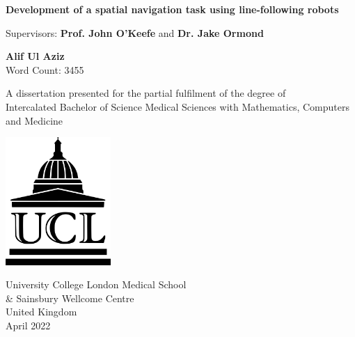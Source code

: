 \documentclass{article}
\newcommand{\detailtexcount}[1]{%
  \immediate\write18{texcount -merge -sum -q #1.tex output.bbl > #1.wcdetail }%
}
\newcommand{\quickwordcount}[1]{%
  \immediate\write18{texcount -1 -sum -merge -q #1.tex output.bbl > #1-words.sum }%
   words%
}
\newcommand{\quickcharcount}[1]{%
  \immediate\write18{texcount -1 -sum -merge -char -q #1.tex output.bbl > #1-chars.sum }%
   characters (not including spaces)%
}
\begin{document}
\doublespacing

\begin{titlepage}
   \begin{center}
       \vspace*{0.5cm}
    \large
       \textbf{Development of a spatial navigation task using line-following robots}

       \vspace{0.5cm}
        Supervisors: \textbf{Prof. John O'Keefe} and \textbf{Dr. Jake Ormond}
            
       \vspace{1.5cm}

       \textbf{Alif Ul Aziz} \\
       Word Count: 3455
       \vfill
            
       A dissertation presented for the partial fulfilment of the degree of\\
       Intercalated Bachelor of Science Medical Sciences with Mathematics, Computers and Medicine
            
       \vspace{0.8cm}
     
       \includegraphics[width=0.3\textwidth]{images/ucl_logo.png}
    
        \vspace{1 cm}
       University College London Medical School \\ \& Sainsbury Wellcome Centre\\
       United Kingdom\\
       April 2022
            
   \end{center}
\end{titlepage}




\pagebreak
\end{document}
